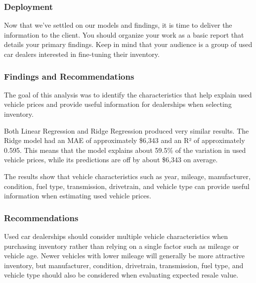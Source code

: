 \documentclass[11pt]{article}
\makeatletter
\newcommand{\boxspacing}{\kern\kvtcb@left@rule\kern\kvtcb@boxsep}
\newcommand{\prompt}[4]{
        {\ttfamily\llap{{\color{#2}[#3]:\hspace{3pt}#4}}\vspace{-\baselineskip}}
    }
\makeatother
\begin{document}
    \begin{tcolorbox}[breakable, size=fbox, boxrule=1pt, pad at break*=1mm,colback=cellbackground, colframe=cellborder]
\prompt{In}{incolor}{ }{\boxspacing}
\begin{Verbatim}[commandchars=\\\{\}]

\end{Verbatim}
\end{tcolorbox}

    \hypertarget{deployment}{%
\subsubsection{Deployment}\label{deployment}}

Now that we've settled on our models and findings, it is time to deliver
the information to the client. You should organize your work as a basic
report that details your primary findings. Keep in mind that your
audience is a group of used car dealers interested in fine-tuning their
inventory.

    \hypertarget{findings-and-recommendations}{%
\subsubsection{Findings and
Recommendations}\label{findings-and-recommendations}}

The goal of this analysis was to identify the characteristics that help
explain used vehicle prices and provide useful information for
dealerships when selecting inventory.

Both Linear Regression and Ridge Regression produced very similar
results. The Ridge model had an MAE of approximately \$6,343 and an R²
of approximately 0.595. This means that the model explains about 59.5\%
of the variation in used vehicle prices, while its predictions are off
by about \$6,343 on average.

The results show that vehicle characteristics such as year, mileage,
manufacturer, condition, fuel type, transmission, drivetrain, and
vehicle type can provide useful information when estimating used vehicle
prices.

\hypertarget{recommendations}{%
\subsubsection{Recommendations}\label{recommendations}}

Used car dealerships should consider multiple vehicle characteristics
when purchasing inventory rather than relying on a single factor such as
mileage or vehicle age. Newer vehicles with lower mileage will generally
be more attractive inventory, but manufacturer, condition, drivetrain,
transmission, fuel type, and vehicle type should also be considered when
evaluating expected resale value.
\end{document}

